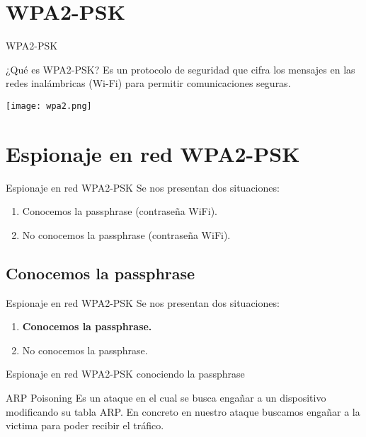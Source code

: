 \documentclass{beamer}
\begin{document}
\section{WPA2-PSK}
\begin{frame}{WPA2-PSK}
\begin{block}{¿Qué es WPA2-PSK?}
	Es un protocolo de seguridad que cifra los mensajes en las redes inalámbricas (Wi-Fi) para permitir comunicaciones seguras.
\end{block}
\begin{center}
	\texttt{[image: wpa2.png]}
\end{center}
\end{frame}

\section{Espionaje en red WPA2-PSK}
\begin{frame}{Espionaje en red WPA2-PSK}
Se nos presentan dos situaciones:
\begin{enumerate}
	\item Conocemos la passphrase (contraseña WiFi).
	\item No conocemos la passphrase (contraseña WiFi).
\end{enumerate}
\end{frame}

\subsection{Conocemos la passphrase}
\begin{frame}{Espionaje en red WPA2-PSK}
	Se nos presentan dos situaciones:
	\begin{enumerate}
		\item \textbf{{\large Conocemos la passphrase.}}
		\item No conocemos la passphrase.
	\end{enumerate}
\end{frame}

\begin{frame}{Espionaje en red WPA2-PSK conociendo la passphrase}
\begin{block}{ARP Poisoning}
	Es un ataque en el cual se busca engañar a un dispositivo modificando su tabla ARP.  En concreto en nuestro ataque buscamos engañar a la victima para poder recibir el tráfico.
\end{block}
\end{frame}
\end{document}
